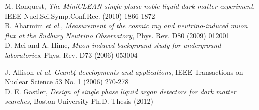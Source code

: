 \documentclass{JINST}
\begin{document}
\begin{thebibliography}{999}

M. Ronquest, \emph{The MiniCLEAN single-phase noble liquid dark matter experiment}, IEEE Nucl.Sci.Symp.Conf.Rec. (2010) 1866-1872 \\

B. Aharmim {\it et al.}, \emph{Measurement of the cosmic ray and neutrino-induced muon flux at the Sudbury Neutrino Observatory}, Phys. Rev. D80 (2009) 012001 \\

D. Mei and A. Hime, \emph{Muon-induced background study for underground laboratories}, Phys. Rev. D73 (2006) 053004

J. Allison {\it et al.} \emph{Geant4 developments and applications}, IEEE Transactions on Nuclear Science 53 No. 1 (2006) 270-278 \\

	D. E. Gastler, \emph{Design of single phase liquid argon detectors for dark matter searches}, Boston University Ph.D. Thesis (2012) \\

\end{thebibliography}
\end{document}

